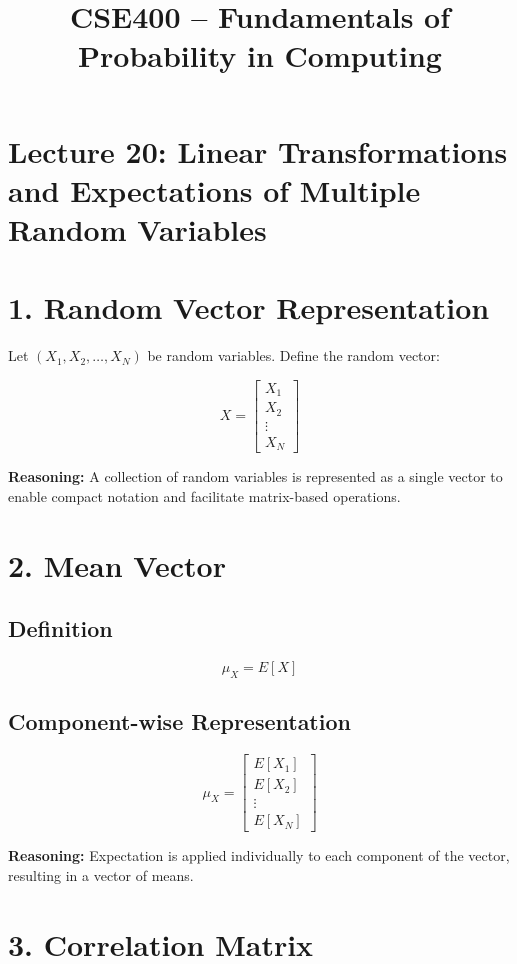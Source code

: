 \documentclass{article}
\title{CSE400 -- Fundamentals of Probability in Computing}
\author{}
\date{}
\begin{document}
\maketitle

\section*{Lecture 20: Linear Transformations and Expectations of Multiple Random Variables}

\section*{1. Random Vector Representation}

Let $(X_1, X_2, \dots, X_N)$ be random variables. Define the random vector:

\[
X =
\begin{bmatrix}
X_1 \\
X_2 \\
\vdots \\
X_N
\end{bmatrix}
\]

\textbf{Reasoning:}  
A collection of random variables is represented as a single vector to enable compact notation and facilitate matrix-based operations.

\section*{2. Mean Vector}

\subsection*{Definition}
\[
\mu_X = E[X]
\]

\subsection*{Component-wise Representation}
\[
\mu_X =
\begin{bmatrix}
E[X_1] \\
E[X_2] \\
\vdots \\
E[X_N]
\end{bmatrix}
\]

\textbf{Reasoning:}  
Expectation is applied individually to each component of the vector, resulting in a vector of means.

\section*{3. Correlation Matrix}
\end{document}
